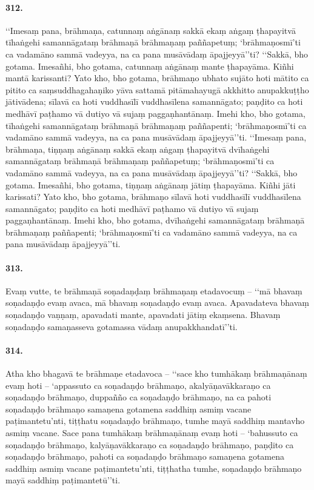 \paragraph{312.} ‘‘Imesaṃ pana, brāhmaṇa, catunnaṃ aṅgānaṃ sakkā ekaṃ aṅgaṃ ṭhapayitvā tīhaṅgehi samannāgataṃ brāhmaṇā brāhmaṇaṃ paññapetuṃ; ‘brāhmaṇosmī’ti ca vadamāno sammā vadeyya, na ca pana musāvādaṃ āpajjeyyā’’ti? ‘‘Sakkā, bho gotama. Imesañhi, bho gotama, catunnaṃ aṅgānaṃ mante ṭhapayāma. Kiñhi mantā karissanti? Yato kho, bho gotama, brāhmaṇo ubhato sujāto hoti mātito ca pitito ca saṃsuddhagahaṇiko yāva sattamā pitāmahayugā akkhitto anupakkuṭṭho jātivādena; sīlavā ca hoti vuddhasīlī vuddhasīlena samannāgato; paṇḍito ca hoti medhāvī paṭhamo vā dutiyo vā sujaṃ paggaṇhantānaṃ. Imehi kho, bho gotama, tīhaṅgehi samannāgataṃ brāhmaṇā brāhmaṇaṃ paññapenti; ‘brāhmaṇosmī’ti ca vadamāno sammā vadeyya, na ca pana musāvādaṃ āpajjeyyā’’ti. ‘‘Imesaṃ pana, brāhmaṇa, tiṇṇaṃ aṅgānaṃ sakkā ekaṃ aṅgaṃ ṭhapayitvā dvīhaṅgehi samannāgataṃ brāhmaṇā brāhmaṇaṃ paññapetuṃ; ‘brāhmaṇosmī’ti ca vadamāno sammā vadeyya, na ca pana musāvādaṃ āpajjeyyā’’ti? ‘‘Sakkā, bho gotama. Imesañhi, bho gotama, tiṇṇaṃ aṅgānaṃ jātiṃ ṭhapayāma. Kiñhi jāti karissati? Yato kho, bho gotama, brāhmaṇo sīlavā hoti vuddhasīlī vuddhasīlena samannāgato; paṇḍito ca hoti medhāvī paṭhamo vā dutiyo vā sujaṃ paggaṇhantānaṃ. Imehi kho, bho gotama, dvīhaṅgehi samannāgataṃ brāhmaṇā brāhmaṇaṃ paññapenti; ‘brāhmaṇosmī’ti ca vadamāno sammā vadeyya, na ca pana musāvādaṃ āpajjeyyā’’ti.

\paragraph{313.} Evaṃ vutte, te brāhmaṇā soṇadaṇḍaṃ brāhmaṇaṃ etadavocuṃ – ‘‘mā bhavaṃ soṇadaṇḍo evaṃ avaca, mā bhavaṃ soṇadaṇḍo evaṃ avaca. Apavadateva bhavaṃ soṇadaṇḍo vaṇṇaṃ, apavadati mante, apavadati jātiṃ ekaṃsena. Bhavaṃ soṇadaṇḍo samaṇasseva gotamassa vādaṃ anupakkhandatī’’ti.

\paragraph{314.} Atha kho bhagavā te brāhmaṇe etadavoca – ‘‘sace kho tumhākaṃ brāhmaṇānaṃ evaṃ hoti – ‘appassuto ca soṇadaṇḍo brāhmaṇo, akalyāṇavākkaraṇo ca soṇadaṇḍo brāhmaṇo, duppañño ca soṇadaṇḍo brāhmaṇo, na ca pahoti soṇadaṇḍo brāhmaṇo samaṇena gotamena saddhiṃ asmiṃ vacane paṭimantetu’nti, tiṭṭhatu soṇadaṇḍo brāhmaṇo, tumhe mayā saddhiṃ mantavho asmiṃ vacane. Sace pana tumhākaṃ brāhmaṇānaṃ evaṃ hoti – ‘bahussuto ca soṇadaṇḍo brāhmaṇo, kalyāṇavākkaraṇo ca soṇadaṇḍo brāhmaṇo, paṇḍito ca soṇadaṇḍo brāhmaṇo, pahoti ca soṇadaṇḍo brāhmaṇo samaṇena gotamena saddhiṃ asmiṃ vacane paṭimantetu’nti, tiṭṭhatha tumhe, soṇadaṇḍo brāhmaṇo mayā saddhiṃ paṭimantetū’’ti.

